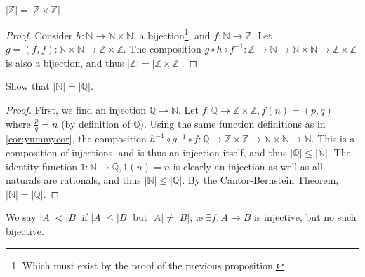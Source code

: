 \documentclass[12pt,oneside]{article}
\begin{document}
\begin{corollary}\label{cor:yummycor}
  $|\mathbb{Z}|=|\mathbb{Z}\times\mathbb{Z}|$
\end{corollary}
\begin{proof}
  Consider $h: \mathbb{N} \to \mathbb{N}\times\mathbb{N}$, a bijection\footnote{Which must exist by the proof of the previous proposition.}, and $f: \mathbb{N} \to \mathbb{Z}$. Let $g=(f,f): \mathbb{N}\times\mathbb{N}\to\mathbb{Z}\times\mathbb{Z}$. The composition $g \circ h \circ f^{-1}: \mathbb{Z} \to \mathbb{N} \to \mathbb{N}\times \mathbb{N} \to \mathbb{Z} \times \mathbb{Z}$ is also a bijection, and thus $|\mathbb{Z}|=|\mathbb{Z}\times\mathbb{Z}|$.
\end{proof}

\begin{example}
  Show that $|\mathbb{N}|=|\mathbb{Q}|$.
  \begin{proof}
    First, we find an injection $\mathbb{Q} \to \mathbb{N}$. Let $f: \mathbb{Q} \to \mathbb{Z} \times \mathbb{Z}, f(n) = (p,q)$ where $\frac{p}{q} = n$ (by definition of $\mathbb{Q}$). Using the same function definitions as in \cref{cor:yummycor}, the composition $h^{-1}\circ g^{-1}\circ f: \mathbb{Q} \to \mathbb{Z}\times \mathbb{Z} \to \mathbb{N}\times\mathbb{N} \to \mathbb{N}$. This is a composition of injections, and is thus an injection itself, and thus $|\mathbb{Q}|\leq|\mathbb{N}|$. The identity function $1:\mathbb{N} \to \mathbb{Q}, 1(n) = n$ is clearly an injection as well as all naturals are rationals, and thus $|\mathbb{N}|\leq|\mathbb{Q}|$. By the Cantor-Bernstein Theorem, $|\mathbb{N}|=|\mathbb{Q}|$.
  \end{proof}
\end{example}

\begin{definition}
  We say $|A| < |B|$ if $|A| \leq |B|$ but $|A| \neq |B|$, ie $\exists f : A \to B$ is injective, but no such bijective.
\end{definition}
\end{document}
